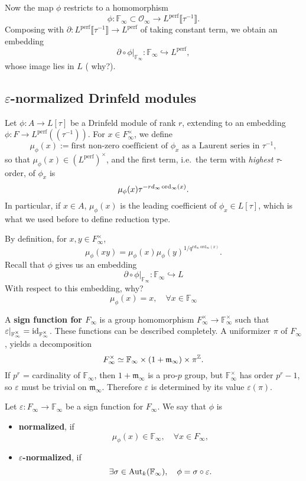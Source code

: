 \documentclass{article}
\newcommand{\F}{\mathbb{F}}
\newcommand{\perf}{\mathrm{perf}}
\renewcommand{\O}{\mathcal{O}}
\newcommand{\m}{\mathfrak{m}}
\begin{document}
Now the map $\phi$ restricts to a homomorphism
\[\phi : \F_\infty\subset\O_\infty\to L^\perf\llbracket \tau^{-1} \rrbracket.\]
Composing with $\partial : L^{\perf}\llbracket \tau^{-1} \rrbracket\to L^\perf$ of taking constant term,
we obtain an embedding \[\partial\circ\phi|_{\F_\infty} : \F_\infty\hookrightarrow L^\perf,\]
whose image lies in $L$ ({\color{red} why?}).


\subsection{\texorpdfstring{$\varepsilon$}{epsilon}-normalized Drinfeld modules}

Let $\phi : A\to L[\tau]$ be a Drinfeld module of rank $r$, extending to an embedding $\phi : F\to L^\perf((\tau^{-1}))$.
For $x\in F_\infty^\times$,
we define \[\mu_\phi(x) := \text{first non-zero coefficient of }\phi_x\text{ as a Laurent series in }\tau^{-1},\]
so that $\mu_\phi(x)\in (L^\perf)^\times$,
and the first term, i.e.\ the term with \textit{highest} $\tau$-order, of $\phi_x$ is
\[\mu_\phi(x)\tau^{-rd_\infty\operatorname{ord}_\infty(x)}.\]
In particular, if $x\in A$, $\mu_\phi(x)$ is the leading coefficient of $\phi_x\in L[\tau]$,
which is what we used before to define reduction type.


By definition, for $x, y\in F_\infty^\times$,
\[\mu_\phi(xy)=\mu_\phi(x)\mu_\phi(y)^{1/q^{rd_\infty\mathrm{~ord}_\infty(x)}}.\]
Recall that $\phi$ gives us an embedding
\[\partial\circ\phi|_{\F_\infty} : \F_\infty\hookrightarrow L\]
With respect to this embedding, {\color{red} why?}
\[\mu_\phi(x) = x, \quad\forall x\in\F_\infty\]

A \textbf{sign function for $F_\infty$} is a
group homomorphism $F_\infty^\times\to\F_\infty^\times$ such that $\varepsilon|_{\F_\infty^\times} = \Id_{\F_\infty^\times}$.
These functions can be described completely.
A uniformizer $\pi$ of $F_\infty$,
yields a decomposition \[F_\infty^\times\simeq \F_\infty\times (1 + \m_\infty)\times \pi^{\Z}.\]
If $p^r$ = cardinality of $\F_\infty$,
then $1 + \m_\infty$ is a pro-$p$ group,
but $\F_\infty^\times$ has order $p^r - 1$,
so $\varepsilon$ must be trivial on $\m_\infty$.
Therefore $\varepsilon$ is determined by its value $\varepsilon(\pi)$.


Let $\varepsilon : F_\infty\to\F_\infty$ be a sign function for $F_\infty$.
We say that $\phi$ is \begin{itemize}
    \item \textbf{normalized}, if \[\mu_\phi(x)\in \F_\infty,\quad \forall x\in F_\infty,\]
    \item $\varepsilon$\textbf{-normalized},
    if \[\exists\sigma\in\aut_k(\F_\infty),\quad \phi = \sigma\circ\varepsilon.\]
\end{itemize}
\end{document}
